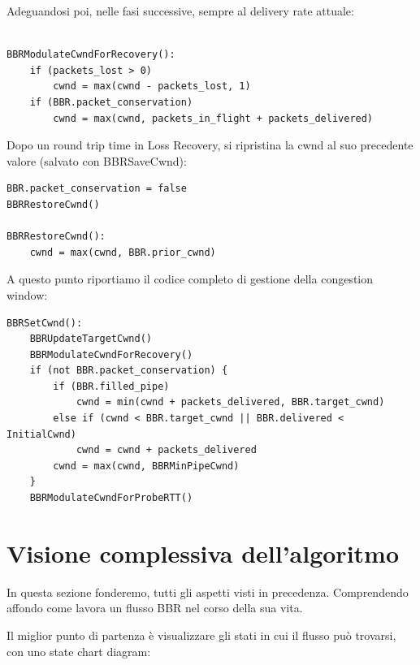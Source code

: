 Adeguandosi poi, nelle fasi successive, sempre al delivery rate attuale:

\begin{lstlisting}[caption=BBRModulateCwndForRecovery]

BBRModulateCwndForRecovery():
	if (packets_lost > 0)
   		cwnd = max(cwnd - packets_lost, 1)
	if (BBR.packet_conservation)
    	cwnd = max(cwnd, packets_in_flight + packets_delivered)

\end{lstlisting}

Dopo un round trip time in Loss Recovery, si ripristina la cwnd al suo precedente valore (salvato con BBRSaveCwnd):

\begin{lstlisting}[caption=BBR exit from loss recovery]
BBR.packet_conservation = false
BBRRestoreCwnd()

BBRRestoreCwnd():
	cwnd = max(cwnd, BBR.prior_cwnd)

\end{lstlisting}

A questo punto riportiamo il codice completo di gestione della congestion window:

\begin{lstlisting}[caption=BBRSetCwnd]
BBRSetCwnd():
	BBRUpdateTargetCwnd()
	BBRModulateCwndForRecovery()
	if (not BBR.packet_conservation) {
   		if (BBR.filled_pipe)
        	cwnd = min(cwnd + packets_delivered, BBR.target_cwnd)
		else if (cwnd < BBR.target_cwnd || BBR.delivered < InitialCwnd)
			cwnd = cwnd + packets_delivered
		cwnd = max(cwnd, BBRMinPipeCwnd)
    }
	BBRModulateCwndForProbeRTT()

\end{lstlisting}

\section{Visione complessiva dell'algoritmo}

In questa sezione fonderemo, tutti gli aspetti visti in precedenza. Comprendendo affondo come lavora un flusso BBR nel corso della sua vita. \bigskip

Il miglior punto di partenza è visualizzare gli stati in cui il flusso può trovarsi, con uno state chart diagram:

